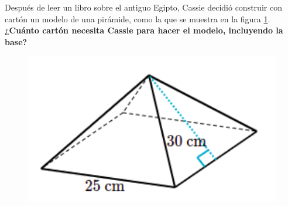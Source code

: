 Después de leer un libro sobre el antiguo Egipto, Cassie decidió construir con cartón un modelo de una pirámide,
como la que se muestra en la figura \ref{fig:prob_verb_superficie_05}.
\textbf{¿Cuánto cartón necesita Cassie para hacer el modelo, incluyendo la base?}

\begin{minipage}{0.3\linewidth}
    \begin{figure}[H]
        \begin{center}
            \includegraphics[width=1\textwidth]{../images/prob_verb_superficie_05}
        \end{center}
        \caption{}
        \label{fig:prob_verb_superficie_05}
    \end{figure}
\end{minipage}
\begin{minipage}{0.7\linewidth}
    \begin{solutionbox}{6cm}
    \end{solutionbox}
\end{minipage}